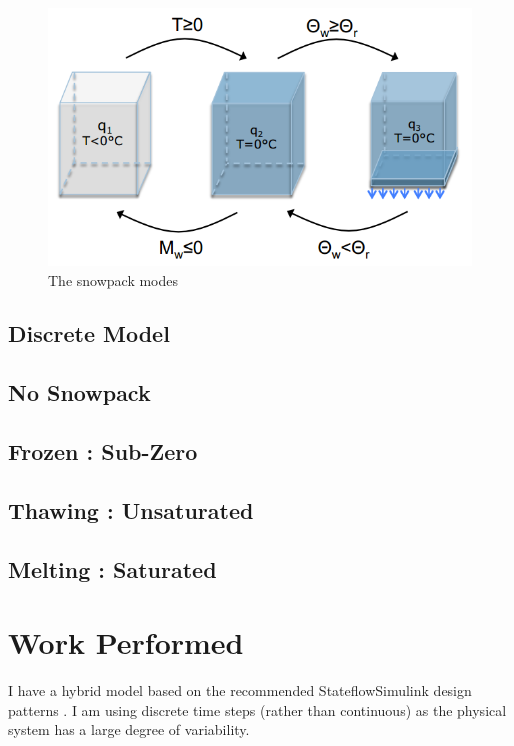 \documentclass{article}
\begin{document}
\begin{figure}
\centering
\includegraphics{discrete_modes.png}
\caption{The snowpack modes}
\label{fig:snowpack_modes}
\end{figure}

\subsection{Discrete Model}

\subsection{No Snowpack}

\subsection{Frozen : Sub-Zero}

\subsection{Thawing : Unsaturated}

\subsection{Melting : Saturated}

\section{Work Performed}

I have a hybrid model based on the recommended
Stateflow\textregistered Simulink\textregistered
design patterns \citep{matlab2009ssdp}.
I am using discrete time steps (rather than continuous) as the
physical system has a large degree of variability.
\end{document}
